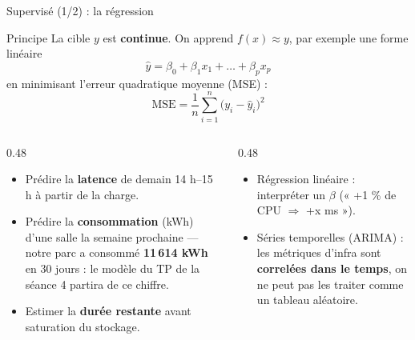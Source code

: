 \begin{frame}{Supervisé (1/2) : la régression}
\footnotesize%
\begin{block}{Principe}
La cible $y$ est \textbf{continue}. On apprend $f(x) \approx y$, par exemple une forme linéaire
\[
\hat{y} = \beta_0 + \beta_1 x_1 + \dots + \beta_p x_p
\]
en minimisant l'erreur quadratique moyenne (MSE) :
\[
\mathrm{MSE} = \frac{1}{n}\sum_{i=1}^{n}\bigl(y_i - \hat{y}_i\bigr)^2
\]
\end{block}
\begin{columns}[t]
\begin{column}{0.48\textwidth}
\begin{ebox}
\begin{itemize}
\item Prédire la \textbf{latence} de demain 14 h--15 h à partir de la charge.
\item Prédire la \textbf{consommation} (kWh) d'une salle la semaine prochaine
--- notre parc a consommé \textbf{11\,614 kWh} en 30 jours : le modèle du TP de la
séance 4 partira de ce chiffre.
\item Estimer la \textbf{durée restante} avant saturation du stockage.
\end{itemize}
\end{ebox}
\end{column}
\begin{column}{0.48\textwidth}
\begin{kbox}
\begin{itemize}
\item Régression linéaire : interpréter un $\beta$ (« +1 \% de CPU $\Rightarrow$ +x ms »).
\item Séries temporelles (ARIMA) : les métriques d'infra sont \textbf{correlées dans le temps},
on ne peut pas les traiter comme un tableau aléatoire.
\end{itemize}
\end{kbox}
\end{column}
\end{columns}
\end{frame}

